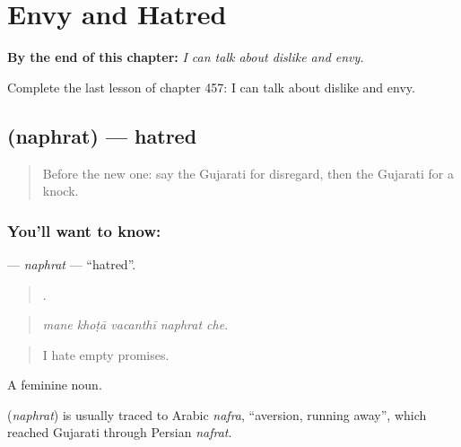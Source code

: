 
\chapter{Envy and Hatred}
\label{ch:gu-envy-and-hatred}

\begin{chapteropening}
\textbf{By the end of this chapter:} \emph{I can talk about dislike and envy.}

Complete the last lesson of chapter 457: I can talk about dislike and envy.
\end{chapteropening}

\section[\texorpdfstring{\gu{નફરત} (naphrat)}{નફરત (naphrat)}]{ (naphrat) — hatred}

\label{lesson:GU-C457-naphrat}



\begin{quote}
Before the new one: say the Gujarati for disregard, then the Gujarati for a knock.
\end{quote}

\subsection*{You'll want to know: }
\textbf{} — \emph{naphrat} — \textquotedblleft{}hatred\textquotedblright{}.

\begin{quote}
    .
\end{quote}

\begin{quote}
\emph{mane khoṭā vacanthī naphrat che.}
\end{quote}

\begin{quote}
I hate empty promises.
\end{quote}

A feminine noun.

\begin{cousinweb}
\textbf{} (\emph{naphrat}) is usually traced to Arabic \emph{nafra}, \textquotedblleft{}aversion, running away\textquotedblright{}, which reached Gujarati through Persian \emph{nafrat}.
\end{cousinweb}

